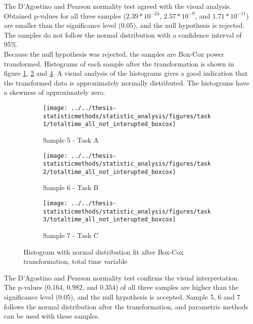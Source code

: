 \begin{appendices}
The D'Agostino and Pearson normality test agreed with the visual analysis. Obtained p-values for all three samples ($2.39 * 10^{-24}$, $2.57 * 10^{-9}$, and $1.71 * 10^{-11}$) are smaller than the significance level (0.05), and the null hypothesis is rejected. The samples do not follow the normal distribution with a confidence interval of 95\%.\\[0.2cm]

Because the null hypothesis was rejected, the samples are Box-Cox power transformed. Histograms of each sample after the transformation is shown in figure \ref{fig:totaltimeallnotinteruptedboxcox_task1}, \ref{fig:totaltimeallnotinteruptedboxcox_task2} and \ref{fig:totaltimeallnotinteruptedboxcox_task3}. A visual analysis of the histograms gives a good indication that the transformed data is approximately normally distributed. The histograms have a skewness of approximately zero. 

\begin{figure}[H]
	\centering
	\begin{subfigure}[b]{0.32\textwidth}
		\centering
		\texttt{[image: ../../thesis-statisticmethods/statistic\_analysis/figures/task1/totaltime\_all\_not\_interupted\_boxcox]}
		\caption{Sample 5 - Task A}
		\label{fig:totaltimeallnotinteruptedboxcox_task1}
	\end{subfigure}
	\begin{subfigure}[b]{0.32\textwidth}
		\centering
		\texttt{[image: ../../thesis-statisticmethods/statistic\_analysis/figures/task2/totaltime\_all\_not\_interupted\_boxcox]}
		\caption{Sample 6 - Task B}
		\label{fig:totaltimeallnotinteruptedboxcox_task2}
	\end{subfigure}
	\begin{subfigure}[b]{0.32\textwidth}
		\centering
		\texttt{[image: ../../thesis-statisticmethods/statistic\_analysis/figures/task3/totaltime\_all\_not\_interupted\_boxcox]}
		\caption{Sample 7 - Task C}
		\label{fig:totaltimeallnotinteruptedboxcox_task3}
	\end{subfigure}
	\caption{Histogram with normal distribution fit after Box-Cox transformation, total time variable}
\end{figure}

The D'Agostino and Pearson normality test confirms the visual interpretation. The p-values ($0.164$, $0.982$, and $0.354$) of all three samples are higher than the significance level (0.05), and the null hypothesis is accepted. Sample 5, 6 and 7 follows the normal distribution after the transformation, and parametric methods can be used with these samples.


\end{appendices}
